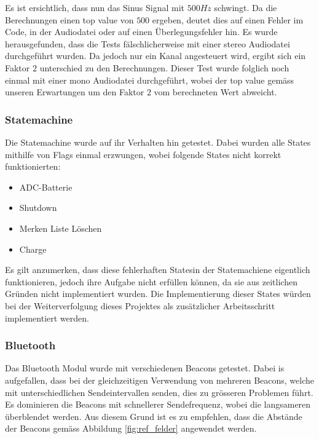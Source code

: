 Es ist ersichtlich, dass nun das Sinus Signal mit $500Hz$ schwingt. Da die Berechnungen einen top value von $500$ ergeben, deutet dies auf einen Fehler im Code, in der Audiodatei oder auf einen Überlegungsfehler hin. Es wurde herausgefunden, dass die Tests fälschlicherweise mit einer stereo Audiodatei durchgeführt wurden. Da jedoch nur ein Kanal angesteuert wird, ergibt sich ein Faktor $2$ unterschied zu den Berechnungen. Dieser Test wurde folglich noch einmal mit einer mono Audiodatei durchgeführt, wobei der top value gemäss unseren Erwartungen um den Faktor $2$ vom berechneten Wert abweicht.

\subsubsection{Statemachine}
Die Statemachine wurde auf ihr Verhalten hin getestet. Dabei wurden alle States mithilfe von Flags einmal erzwungen, wobei folgende States nicht korrekt funktionierten:

\begin{itemize}
	\item ADC-Batterie 
	\item Shutdown
	\item Merken Liste Löschen
	\item Charge
\end{itemize}

Es gilt anzumerken, dass diese \glqq fehlerhaften States\grqq in der Statemachiene eigentlich funktionieren, jedoch ihre Aufgabe nicht erfüllen können, da sie aus zeitlichen Gründen nicht implementiert wurden. Die Implementierung dieser States würden bei der Weiterverfolgung dieses Projektes als zusätzlicher Arbeitsschritt implementiert werden.

\subsubsection{Bluetooth}
Das Bluetooth Modul wurde mit verschiedenen Beacons getestet. Dabei is aufgefallen, dass bei der gleichzeitigen Verwendung von mehreren Beacons, welche mit unterschiedlichen Sendeintervallen senden, dies zu grösseren Problemen führt. Es dominieren die Beacons mit schnellerer Sendefrequenz, wobei die langsameren überblendet werden. Aus diesem Grund ist es zu empfehlen, dass die Abstände der Beacons gemäss Abbildung \ref{fig:ref_felder} angewendet werden.

